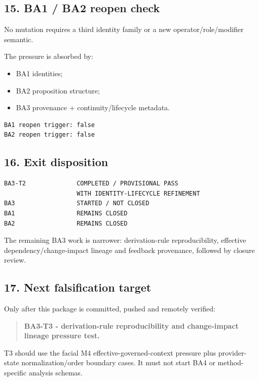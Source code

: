 \documentclass[11pt,a4paper]{article}
\providecommand{\tightlist}{\setlength{\itemsep}{0pt}\setlength{\parskip}{0pt}}\setlength{\emergencystretch}{4em}\hbadness=10000\hfuzz=20pt\sloppy
\begin{document}
\subsection{15. BA1 / BA2 reopen check}\label{ba1-ba2-reopen-check}

No mutation requires a third identity family or a new
operator/role/modifier semantic.

The pressure is absorbed by:

\begin{itemize}
\tightlist
\item
  BA1 identities;
\item
  BA2 proposition structure;
\item
  BA3 provenance + continuity/lifecycle metadata.
\end{itemize}

\begin{verbatim}
BA1 reopen trigger: false
BA2 reopen trigger: false
\end{verbatim}

\subsection{16. Exit disposition}\label{exit-disposition}

\begin{verbatim}
BA3-T2              COMPLETED / PROVISIONAL PASS
                    WITH IDENTITY-LIFECYCLE REFINEMENT
BA3                 STARTED / NOT CLOSED
BA1                 REMAINS CLOSED
BA2                 REMAINS CLOSED
\end{verbatim}

The remaining BA3 work is narrower: derivation-rule reproducibility,
effective dependency/change-impact lineage and feedback provenance,
followed by closure review.

\subsection{17. Next falsification
target}\label{next-falsification-target}

Only after this package is committed, pushed and remotely verified:

\begin{quote}
\textbf{BA3-T3 - derivation-rule reproducibility and change-impact
lineage pressure test.}
\end{quote}

T3 should use the facial M4 effective-governed-context pressure plus
provider-state normalization/order boundary cases. It must not start BA4
or method-specific analysis schemas.
\end{document}
